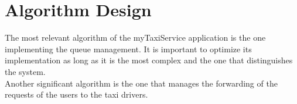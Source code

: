 
%
	\newpage
	
	\section{Algorithm Design}
		The most relevant algorithm of the myTaxiService application is the one implementing the queue management. It is important to optimize its implementation as long as it is the most complex and the one that distinguishes the system.\\
		Another significant algorithm is the one that manages the forwarding of the requests of the users to the taxi drivers.
